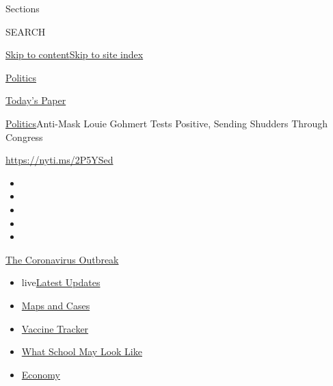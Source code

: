 Sections

SEARCH

\protect\hyperlink{site-content}{Skip to
content}\protect\hyperlink{site-index}{Skip to site index}

\href{https://www.nytimes.com/section/politics}{Politics}

\href{https://myaccount.nytimes.com/auth/login?response_type=cookie\&client_id=vi}{}

\href{https://www.nytimes.com/section/todayspaper}{Today's Paper}

\href{/section/politics}{Politics}\textbar{}Anti-Mask Louie Gohmert
Tests Positive, Sending Shudders Through Congress

\url{https://nyti.ms/2P5YSed}

\begin{itemize}
\item
\item
\item
\item
\item
\end{itemize}

\href{https://www.nytimes.com/news-event/coronavirus?action=click\&pgtype=Article\&state=default\&region=TOP_BANNER\&context=storylines_menu}{The
Coronavirus Outbreak}

\begin{itemize}
\tightlist
\item
  live\href{https://www.nytimes.com/2020/08/01/world/coronavirus-covid-19.html?action=click\&pgtype=Article\&state=default\&region=TOP_BANNER\&context=storylines_menu}{Latest
  Updates}
\item
  \href{https://www.nytimes.com/interactive/2020/us/coronavirus-us-cases.html?action=click\&pgtype=Article\&state=default\&region=TOP_BANNER\&context=storylines_menu}{Maps
  and Cases}
\item
  \href{https://www.nytimes.com/interactive/2020/science/coronavirus-vaccine-tracker.html?action=click\&pgtype=Article\&state=default\&region=TOP_BANNER\&context=storylines_menu}{Vaccine
  Tracker}
\item
  \href{https://www.nytimes.com/interactive/2020/07/29/us/schools-reopening-coronavirus.html?action=click\&pgtype=Article\&state=default\&region=TOP_BANNER\&context=storylines_menu}{What
  School May Look Like}
\item
  \href{https://www.nytimes.com/live/2020/07/31/business/stock-market-today-coronavirus?action=click\&pgtype=Article\&state=default\&region=TOP_BANNER\&context=storylines_menu}{Economy}
\end{itemize}

